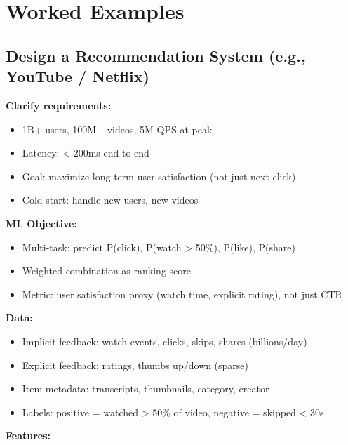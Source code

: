 \documentclass[11pt]{article}
\providecommand{\tightlist}{\setlength{\itemsep}{1pt}\setlength{\parskip}{0pt}}
\begin{document}
\section{Worked Examples}\label{worked-examples}

\subsection{Design a Recommendation System (e.g., YouTube / Netflix)}\label{design-a-recommendation-system-eg-youtube--netflix}

\textbf{Clarify requirements:}

\begin{itemize}
\tightlist
\item
  1B+ users, 100M+ videos, 5M QPS at peak
\item
  Latency: \textless{} 200ms end-to-end
\item
  Goal: maximize long-term user satisfaction (not just next click)
\item
  Cold start: handle new users, new videos
\end{itemize}

\textbf{ML Objective:}

\begin{itemize}
\tightlist
\item
  Multi-task: predict P(click), P(watch \textgreater{} 50\%), P(like), P(share)
\item
  Weighted combination as ranking score
\item
  Metric: user satisfaction proxy (watch time, explicit rating), not just CTR
\end{itemize}

\textbf{Data:}

\begin{itemize}
\tightlist
\item
  Implicit feedback: watch events, clicks, skips, shares (billions/day)
\item
  Explicit feedback: ratings, thumbs up/down (sparse)
\item
  Item metadata: transcripts, thumbnails, category, creator
\item
  Labels: positive = watched \textgreater{} 50\% of video, negative = skipped \textless{} 30s
\end{itemize}

\textbf{Features:}
\end{document}
